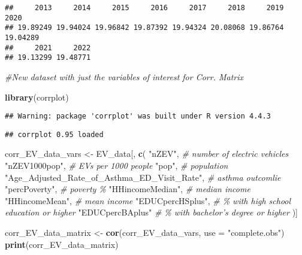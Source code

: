 \documentclass[
]{article}
\newenvironment{Shaded}{\begin{snugshade}}{\end{snugshade}}
\newcommand{\AttributeTok}[1]{\textcolor[rgb]{0.13,0.29,0.53}{#1}}
\newcommand{\CommentTok}[1]{\textcolor[rgb]{0.56,0.35,0.01}{\textit{#1}}}
\newcommand{\ConstantTok}[1]{\textcolor[rgb]{0.56,0.35,0.01}{#1}}
\newcommand{\FunctionTok}[1]{\textcolor[rgb]{0.13,0.29,0.53}{\textbf{#1}}}
\newcommand{\NormalTok}[1]{#1}
\newcommand{\OtherTok}[1]{\textcolor[rgb]{0.56,0.35,0.01}{#1}}
\newcommand{\SpecialCharTok}[1]{\textcolor[rgb]{0.81,0.36,0.00}{\textbf{#1}}}
\newcommand{\StringTok}[1]{\textcolor[rgb]{0.31,0.60,0.02}{#1}}
\begin{document}
\begin{Shaded}
\end{Shaded}

\begin{verbatim}
##     2013     2014     2015     2016     2017     2018     2019     2020 
## 19.89249 19.94024 19.96842 19.87392 19.94324 20.08068 19.86764 19.04289 
##     2021     2022 
## 19.13299 19.48771
\end{verbatim}

\begin{Shaded}
\begin{Highlighting}[]
\CommentTok{\#New dataset with just the variables of interest for Corr. Matrix}

\FunctionTok{library}\NormalTok{(corrplot)}
\end{Highlighting}
\end{Shaded}

\begin{verbatim}
## Warning: package 'corrplot' was built under R version 4.4.3
\end{verbatim}

\begin{verbatim}
## corrplot 0.95 loaded
\end{verbatim}

\begin{Shaded}
\begin{Highlighting}[]
\NormalTok{corr\_EV\_data\_vars }\OtherTok{\textless{}{-}}\NormalTok{ EV\_data[, }\FunctionTok{c}\NormalTok{(}
  \StringTok{"nZEV"}\NormalTok{,                      }\CommentTok{\# number of electric vehicles}
  \StringTok{"nZEV1000pop"}\NormalTok{,              }\CommentTok{\# EVs per 1000 people}
  \StringTok{"pop"}\NormalTok{,                      }\CommentTok{\# population}
  \StringTok{"Age\_Adjusted\_Rate\_of\_Asthma\_ED\_Visit\_Rate"}\NormalTok{,  }\CommentTok{\# asthma outcomlie}
  \StringTok{"percPoverty"}\NormalTok{,              }\CommentTok{\# poverty \%}
  \StringTok{"HHincomeMedian"}\NormalTok{,           }\CommentTok{\# median income}
  \StringTok{"HHincomeMean"}\NormalTok{,             }\CommentTok{\# mean income}
  \StringTok{"EDUCpercHSplus"}\NormalTok{,           }\CommentTok{\# \% with high school education or higher}
  \StringTok{"EDUCpercBAplus"}            \CommentTok{\# \% with bachelor’s degree or higher}
\NormalTok{)]}

\NormalTok{corr\_EV\_data\_matrix }\OtherTok{\textless{}{-}} \FunctionTok{cor}\NormalTok{(corr\_EV\_data\_vars, }\AttributeTok{use =} \StringTok{"complete.obs"}\NormalTok{)}
\FunctionTok{print}\NormalTok{(corr\_EV\_data\_matrix)}
\end{Highlighting}
\end{Shaded}
\end{document}
